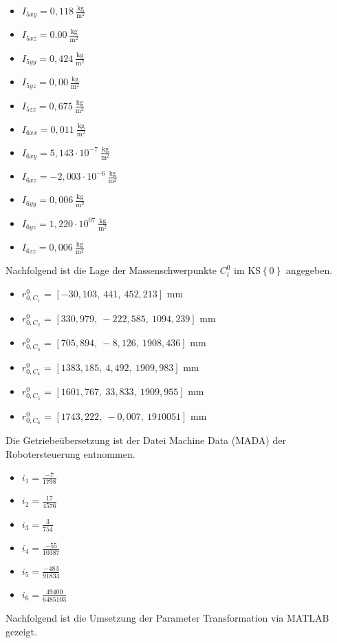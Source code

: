 \begin{itemize}
	\item $I_{5xy} = 0,118~\frac{\text{kg}}{\text{m}^2}$
	\item $I_{5xz} = 0.00~\frac{\text{kg}}{\text{m}^2}$
	\item $I_{5yy} = 0,424~\frac{\text{kg}}{\text{m}^2}$
	\item $I_{5yz} = 0,00~\frac{\text{kg}}{\text{m}^2}$
	\item $I_{5zz} = 0,675~\frac{\text{kg}}{\text{m}^2}$
	\\
	\item $I_{6xx} = 0,011~\frac{\text{kg}}{\text{m}^2}$
	\item $I_{6xy} = 5,143\cdot10^{-7}~\frac{\text{kg}}{\text{m}^2}$
	\item $I_{6xz} = -2,003\cdot10^{-6}~\frac{\text{kg}}{\text{m}^2}$
	\item $I_{6yy} = 0,006~\frac{\text{kg}}{\text{m}^2}$
	\item $I_{6yz} = 1,220\cdot10^{07}~\frac{\text{kg}}{\text{m}^2}$
	\item $I_{6zz} = 0,006~\frac{\text{kg}}{\text{m}^2}$
\end{itemize}
%
Nachfolgend ist die Lage der Massenschwerpunkte $C_i^0$ im KS$\left\{0\right\}$ angegeben. 
% 
\begin{itemize}
	\item $r_{0,C_1}^0$ = $\left[-30,103,~441,~452,213\right]$ mm
	\item $r_{0,C_2}^0$ = $\left[330,979,~-222,585,~1094,239\right]$ mm
	\item $r_{0,C_3}^0$ = $\left[705,894,~-8,126,~1908,436\right]$ mm
	\item $r_{0,C_4}^0$ = $\left[1383,185,~4,492,~1909,983\right]$ mm
	\item $r_{0,C_5}^0$ = $\left[1601,767,~33,833,~1909,955\right]$ mm
	\item $r_{0,C_6}^0$ = $\left[1743,222,~-0,007,~1910 051\right]$ mm
\end{itemize}
%
Die Getriebeübersetzung ist der Datei Machine Data (MADA) der Robotersteuerung entnommen.
%
\begin{itemize}
	\item $i_1 = \frac{-7}{1798}$
	\item $i_2 = \frac{17}{4576}$
	\item $i_3 = \frac{3}{754}$
	\item $i_4 = \frac{-55}{10387}$
	\item $i_5 = \frac{-483}{91834}$
	\item $i_6 = \frac{49400}{6485103}$
\end{itemize}
Nachfolgend ist die Umsetzung der Parameter Transformation via MATLAB\textsuperscript{\textregistered} gezeigt. 
%

%
\setcounter{chapter}{2}
\setcounter{section}{3}
\setcounter{table}{0}
\setcounter{figure}{0}
%
